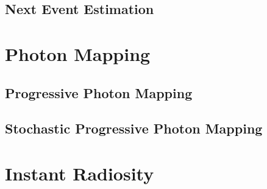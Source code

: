 \subsection{Next Event Estimation}




\section{Photon Mapping}

\subsection{Progressive Photon Mapping}

\subsection{Stochastic Progressive Photon Mapping}




\section{Instant Radiosity}
